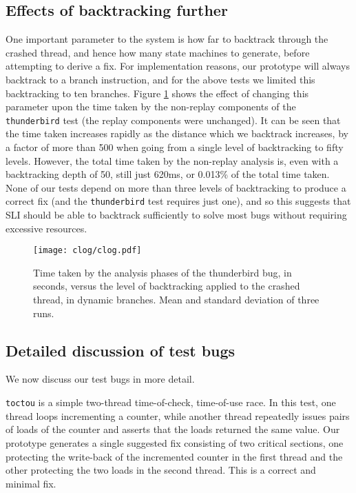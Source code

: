 \documentclass[10pt,twocolumn,preprint,natbib,authoryear]{sigplanconf}
\begin{document}
\subsection{Effects of backtracking further}
\label{sect:eval:backtrack}

One important parameter to the system is how far to backtrack through
the crashed thread, and hence how many state machines to generate,
before attempting to derive a fix.  For implementation reasons, our
prototype will always backtrack to a branch instruction, and for the
above tests we limited this backtracking to ten branches.  Figure
\ref{fig:eval:backtrack} shows the effect of changing this parameter
upon the time taken by the non-replay components of the
\verb|thunderbird| test (the replay components were unchanged).  It
can be seen that the time taken increases rapidly as the distance
which we backtrack increases, by a factor of more than 500 when going
from a single level of backtracking to fifty levels.  However, the
total time taken by the non-replay analysis is, even with a
backtracking depth of 50, still just 620ms, or 0.013\% of the total
time taken.  None of our tests depend on more than three levels of
backtracking to produce a correct fix (and the \verb|thunderbird| test
requires just one), and so this suggests that SLI should be able to
backtrack sufficiently to solve most bugs without requiring excessive
resources.

\begin{figure}
\texttt{[image: clog/clog.pdf]}
\caption{Time taken by the analysis phases of the thunderbird bug, in
  seconds, versus the level of backtracking applied to the crashed
  thread, in dynamic branches.  Mean and standard deviation of three
  runs.}
\label{fig:eval:backtrack}
\end{figure}


\subsection{Detailed discussion of test bugs}
\label{sect:bug_descr}

We now discuss our test bugs in more detail.

\verb|toctou| is a simple two-thread time-of-check, time-of-use race.
In this test, one thread loops incrementing a counter, while another
thread repeatedly issues pairs of loads of the counter and asserts
that the loads returned the same value.  Our prototype generates a
single suggested fix consisting of two critical sections, one
protecting the write-back of the incremented counter in the first
thread and the other protecting the two loads in the second thread.
This is a correct and minimal fix.
\end{document}
